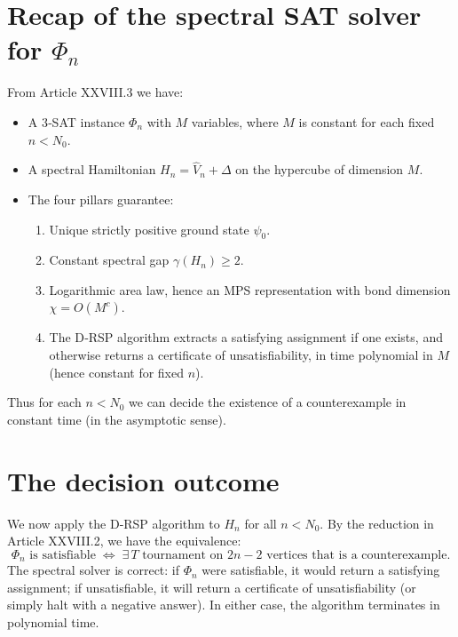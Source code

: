 \documentclass[11pt,a4paper]{article}
\begin{document}
\section{Recap of the spectral SAT solver for $\Phi_n$}
From Article XXVIII.3 we have:
\begin{itemize}
\item A 3‑SAT instance $\Phi_n$ with $M$ variables, where $M$ is constant for each fixed $n < N_0$.
\item A spectral Hamiltonian $H_n = \hat{V}_n + \Delta$ on the hypercube of dimension $M$.
\item The four pillars guarantee:
  \begin{enumerate}
  \item Unique strictly positive ground state $\psi_0$.
  \item Constant spectral gap $\gamma(H_n) \ge 2$.
  \item Logarithmic area law, hence an MPS representation with bond dimension $\chi = O(M^c)$.
  \item The D‑RSP algorithm extracts a satisfying assignment if one exists, and otherwise returns a certificate of unsatisfiability, in time polynomial in $M$ (hence constant for fixed $n$).
  \end{enumerate}
\end{itemize}
Thus for each $n < N_0$ we can decide the existence of a counterexample in constant time (in the asymptotic sense).

\section{The decision outcome}
We now apply the D‑RSP algorithm to $H_n$ for all $n < N_0$. By the reduction in Article XXVIII.2, we have the equivalence:
\[
\Phi_n \text{ is satisfiable} \;\Longleftrightarrow\; \exists\, T \text{ tournament on } 2n-2 \text{ vertices that is a counterexample}.
\]
The spectral solver is correct: if $\Phi_n$ were satisfiable, it would return a satisfying assignment; if unsatisfiable, it will return a certificate of unsatisfiability (or simply halt with a negative answer). In either case, the algorithm terminates in polynomial time.
\end{document}
